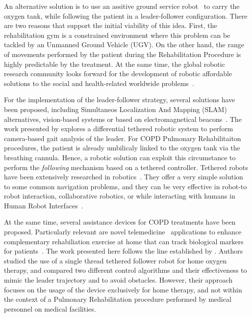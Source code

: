 \documentclass[journal]{IEEEtran}
\begin{document}
An alternative solution is to use an assitive ground service robot~\cite{Neto2015} to carry the oxygen tank, while following the patient in a leader-follower configuration.  There are two reasons that support the initial viability of this idea.  First,  the rehabilitation gym is a constrained environment where this problem can be tackled by an Unmanned Ground Vehicle (UGV).  On the other hand, the range of movements performed by the patient during the Rehabilitation Procedure is highly predictable by the treatment.  At the same time,  the global robotic research community looks forward for the development of robotic affordable solutions to the social and health-related worldwide problems~\cite{Khamis2019}.

For the implementation of the leader-follower strategy, several solutions have been proposed, including Simultaneos Localization And Mapping (SLAM) alternatives, vision-based systems or based on electromagnetical beacons~\cite{Islam2019}.   The work presented by \cite{Ortlieb2016} explores a differential tethered robotic system to perform camera-based gait analysis of the leader.  For COPD Pulmonary Rehabilitaiton procedures, the patient is already umbilicaly linked to the oxygen tank via the breathing cannula.  Hence, a robotic solution can exploit this circumstance to perform the \textit{following} mechanism based on a tethered controller. Tethered robots have been extensively researched in robotics~\cite{Ahn2006}.  They offer a very simple solution to some common navigation problems, and they can be very effective in robot-to robot interaction, collaborative robotics, or while interacting with humans in Human Robot Interfaces~\cite{Rekleitis2001,Hirata2009,Ferrin2010}. 

At the same time, several assistance devices for COPD treatments have been proposed.  Particularly relevant are novel telemedicine~\cite{Banerjee2020} applications to enhance complementary rehabiliation exercise at home that can track biological markers for patients~\cite{Yang2018,Wu2012}.  The work presented here follows the line established by \cite{Endo2015}.  Authors studied the use of a single thread tethered follower robot for home oxygen therapy, and compared two different control algorithms and their effectiveness to mimic the leader trajectory and to avoid obstacles.  However, their approach focuses on the usage of the device exclusively for home therapy, and not within the context of a Pulmonary Rehabilitation procedure performed by medical personnel on medical facilities.
\end{document}
